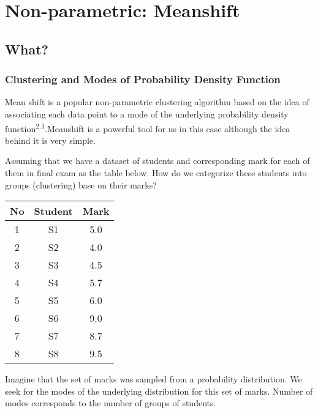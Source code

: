 \section{Non-parametric: Meanshift}

\subsection{What?}
\subsubsection{Clustering and Modes of Probability Density Function}
Mean shift  is a popular non-parametric clustering algorithm based on the
idea of associating each data point to a mode of the underlying probability density
function\textsuperscript{2.1}.Meanshift is a powerful tool for us in this case although the idea behind it is very simple. {\linebreak}

Assuming that we have a dataset of students and corresponding mark for each of them 
in final exam as the table below. How do we categorize these students into groups (clustering) base on their marks?
\begin{center}
 \begin{tabular}{||c c c||} 
 \hline
 No & Student & Mark \\ [0.5ex] 
 \hline\hline
 1 & S1 & 5.0 \\ 
 \hline
 2 & S2 & 4.0 \\
 \hline
 3 & S3 & 4.5 \\
 \hline
 4 & S4 & 5.7 \\
 \hline
 5 & S5 & 6.0 \\ 
  \hline
 6 & S6 & 9.0 \\ 
  \hline
 7 & S7 & 8.7 \\ 
  \hline
 8 & S8 & 9.5 \\ 
 [1ex] 
 \hline
\end{tabular}
\end{center}

Imagine that the set of marks was sampled from a probability distribution. We seek for the modes of  the underlying distribution for this set of marks. Number of modes corresponds to the number of groups of students.

